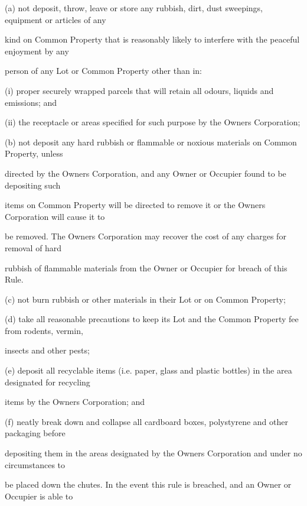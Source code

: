 \documentclass{article}
\begin{document}
{\fontsize{9.962}{1}(a) not deposit, throw, leave or store any rubbish, dirt, dust sweepings, equipment or articles of any }

{\fontsize{10.02}{1}kind on Common Property that is reasonably likely to interfere with the peaceful enjoyment by any }

{\fontsize{10.02}{1}person of any Lot or Common Property other than in: }

{\fontsize{9.962}{1}(i) proper securely wrapped parcels that will retain all odours, liquids and emissions; and }

{\fontsize{9.962}{1}(ii) the receptacle or areas specified for such purpose by the Owners Corporation; }

{\fontsize{9.962}{1}(b) not deposit any hard rubbish or flammable or noxious materials on Common Property, unless }

{\fontsize{10.02}{1}directed by the Owners Corporation, and any Owner or Occupier found to be depositing such }

{\fontsize{10.02}{1}items on Common Property will be directed to remove it or the Owners Corporation will cause it to }

{\fontsize{10.02}{1}be removed. The Owners Corporation may recover the cost of any charges for removal of hard }

{\fontsize{10.02}{1}rubbish of flammable materials from the Owner or Occupier for breach of this Rule. }

{\fontsize{9.962}{1}(c) not burn rubbish or other materials in their Lot or on Common Property; }

{\fontsize{9.962}{1}(d) take all reasonable precautions to keep its Lot and the Common Property fee from rodents, vermin, }

{\fontsize{10.02}{1}insects and other pests; }

{\fontsize{9.962}{1}(e) deposit all recyclable items (i.e. paper, glass and plastic bottles) in the area designated for recycling }

{\fontsize{10.02}{1}items by the Owners Corporation; and }

{\fontsize{9.962}{1}(f) neatly break down and collapse all cardboard boxes, polystyrene and other packaging before }

{\fontsize{10.02}{1}depositing them in the areas designated by the Owners Corporation and under no circumstances to }

{\fontsize{10.02}{1}be placed down the chutes. In the event this rule is breached, and an Owner or Occupier is able to }
\end{document}
